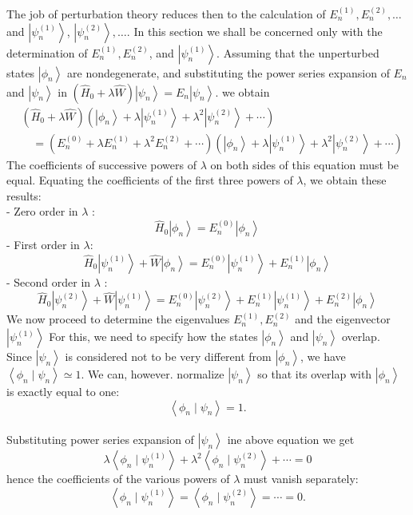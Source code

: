 The job of perturbation theory reduces then to the calculation of $E_{n}^{(1)}, E_{n}^{(2)}, \ldots$ and $\left|\psi_{n}^{(1)}\right\rangle$, $\left|\psi_{n}^{(2)}\right\rangle, \ldots .$ In this section we shall be concerned only with the determination of $E_{n}^{(1)}, E_{n}^{(2)}$, and $\left|\psi_{n}^{(1)}\right\rangle .$ Assuming that the unperturbed states $\left|\phi_{n}\right\rangle$ are nondegenerate, and substituting the power series expansion of $E_{n}$ and $\left|\psi_{n}\right\rangle $ in $
\left(\hat{H}_{0}+\lambda \hat{W}\right)\left|\psi_{n}\right\rangle=E_{n}\left|\psi_{n}\right\rangle .
$ we obtain
$$
\begin{aligned}
&\left(\hat{H}_{0}+\lambda \hat{W}\right)\left(\left|\phi_{n}\right\rangle+\lambda\left|\psi_{n}^{(1)}\right\rangle+\lambda^{2}\left|\psi_{n}^{(2)}\right\rangle+\cdots\right) \\
&\quad=\left(E_{n}^{(0)}+\lambda E_{n}^{(1)}+\lambda^{2} E_{n}^{(2)}+\cdots\right)\left(\left|\phi_{n}\right\rangle+\lambda\left|\psi_{n}^{(1)}\right\rangle+\lambda^{2}\left|\psi_{n}^{(2)}\right\rangle+\cdots\right)
\end{aligned}
$$
The coefficients of successive powers of $\lambda$ on both sides of this equation must be equal. Equating the coefficients of the first three powers of $\lambda$, we obtain these results:\\
- Zero order in $\lambda$ :
$$
\hat{H}_{0}\left|\phi_{n}\right\rangle=E_{n}^{(0)}\left|\phi_{n}\right\rangle
$$
- First order in $\lambda:$
$$
\hat{H}_{0}\left|\psi_{n}^{(1)}\right\rangle+\hat{W}\left|\phi_{n}\right\rangle=E_{n}^{(0)}\left|\psi_{n}^{(1)}\right\rangle+E_{n}^{(1)}\left|\phi_{n}\right\rangle
$$
- Second order in $\lambda$ :
$$
\hat{H}_{0}\left|\psi_{n}^{(2)}\right\rangle+\hat{W}\left|\psi_{n}^{(1)}\right\rangle=E_{n}^{(0)}\left|\psi_{n}^{(2)}\right\rangle+E_{n}^{(1)}\left|\psi_{n}^{(1)}\right\rangle+E_{n}^{(2)}\left|\phi_{n}\right\rangle
$$
We now proceed to determine the eigenvalues $E_{n}^{(1)}, E_{n}^{(2)}$ and the eigenvector $\left|\psi_{n}^{(1)}\right\rangle$  For this, we need to specify how the states $\left|\phi_{n}\right\rangle$ and $\left|\psi_{n}\right\rangle$ overlap. Since $\left|\psi_{n}\right\rangle$ is considered not to be very different from $\left|\phi_{n}\right\rangle$, we have $\left\langle\phi_{n} \mid \psi_{n}\right\rangle \simeq 1 .$ We can, however. normalize $\left|\psi_{n}\right\rangle$ so that its overlap with $\left|\phi_{n}\right\rangle$ is exactly equal to one:\\
$$\left\langle\phi_{n} \mid \psi_{n}\right\rangle=1 .$$\\
Substituting power series expansion of $\left|\psi_{n}\right\rangle $ ine above equation we get\\
$$
\lambda\left\langle\phi_{n} \mid \psi_{n}^{(1)}\right\rangle+\lambda^{2}\left\langle\phi_{n} \mid \psi_{n}^{(2)}\right\rangle+\cdots=0
$$
hence the coefficients of the various powers of $\lambda$ must vanish separately:
$$
\left\langle\phi_{n} \mid \psi_{n}^{(1)}\right\rangle=\left\langle\phi_{n} \mid \psi_{n}^{(2)}\right\rangle=\cdots=0 .
$$
